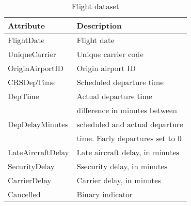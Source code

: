 \begin{table*}[!htb] \scriptsize
    \begin{subtable}{.5\linewidth}
      \centering

       \begin{tabular}[t]{|l|l|}
  \hline
  \bf{Attribute}   & \bf{Description}  \\  \hline
  FlightDate & Flight date   \\ \hline
  UniqueCarrier	& Unique carrier code   \\ \hline
  OriginAirportID & 	Origin airport ID  \\ \hline
  CRSDepTime & Scheduled departure time  \\ \hline
  DepTime & Actual departure time \\ \hline
    & difference in minutes between   \\
  DepDelayMinutes & scheduled and actual departure \\
   & time. Early departures set to 0  \\ \hline
  LateAircraftDelay & Late aircraft delay, in minutes  \\ \hline
  SecurityDelay & Ssecurity delay, in minutes \\ \hline
  CarrierDelay & Carrier delay, in minutes  \\ \hline
  Cancelled & Binary indicator  \\
  \hline
\end{tabular}
     \caption{Flight dataset}
    \end{subtable}%
    \begin{subtable}{.5\linewidth}
      \centering



\end{subtable}
\end{table*}
